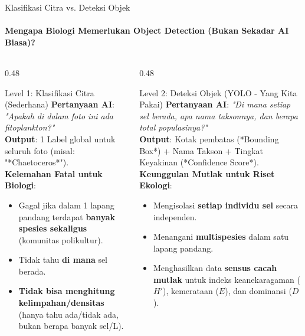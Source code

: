 \documentclass[aspectratio=169, 10pt]{beamer}
\begin{document}
\begin{frame}{Klasifikasi Citra vs. Deteksi Objek}
    \framesubtitle{Mengapa Biologi Memerlukan Object Detection (Bukan Sekadar AI Biasa)?}
    
    \begin{columns}[T]
        \begin{column}{0.48\textwidth}
            \begin{conceptcard}{Level 1: Klasifikasi Citra (Sederhana)}
                \scriptsize
                \textbf{Pertanyaan AI}: \textit{"Apakah di dalam foto ini ada fitoplankton?"}\\
                \textbf{Output}: 1 Label global untuk seluruh foto (misal: "*Chaetoceros*").\\[3pt]
                \color{CoralAccent}\textbf{Kelemahan Fatal untuk Biologi}:
                \begin{itemize}\setlength\itemsep{2pt}
                    \item Gagal jika dalam 1 lapang pandang terdapat \textbf{banyak spesies sekaligus} (komunitas polikultur).
                    \item Tidak tahu \textbf{di mana} sel berada.
                    \item \textbf{Tidak bisa menghitung kelimpahan/densitas} (hanya tahu ada/tidak ada, bukan berapa banyak sel/L).
                \end{itemize}
            \end{conceptcard}
        \end{column}
        
        \begin{column}{0.48\textwidth}
            \begin{biocard}{Level 2: Deteksi Objek (YOLO - Yang Kita Pakai)}
                \scriptsize
                \textbf{Pertanyaan AI}: \textit{"Di mana setiap sel berada, apa nama taksonnya, dan berapa total populasinya?"}\\
                \textbf{Output}: Kotak pembatas (*Bounding Box*) + Nama Takson + Tingkat Keyakinan (*Confidence Score*).\\[3pt]
                \color{AlgaeGreen}\textbf{Keunggulan Mutlak untuk Riset Ekologi}:
                \begin{itemize}\setlength\itemsep{2pt}
                    \item Mengisolasi \textbf{setiap individu sel} secara independen.
                    \item Menangani \textbf{multispesies} dalam satu lapang pandang.
                    \item Menghasilkan data \textbf{sensus cacah mutlak} untuk indeks keanekaragaman ($H'$), kemerataan ($E$), dan dominansi ($D$).
                \end{itemize}
            \end{biocard}
        \end{column}
    \end{columns}
\end{frame}
\end{document}
